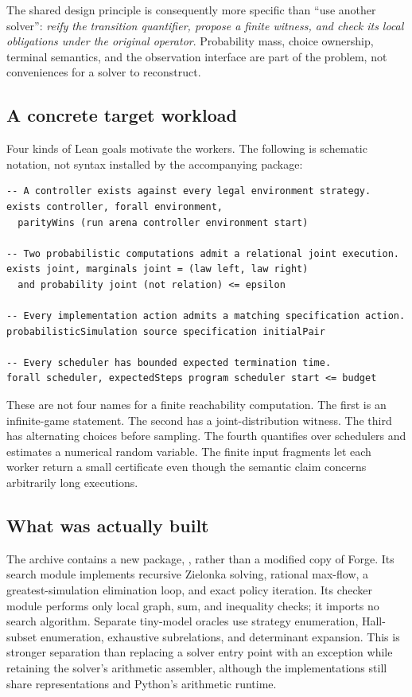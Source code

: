 The shared design principle is consequently more specific than ``use another
solver'': \emph{reify the transition quantifier, propose a finite witness, and
check its local obligations under the original operator}. Probability mass,
choice ownership, terminal semantics, and the observation interface are part of
the problem, not conveniences for a solver to reconstruct.

\subsection{A concrete target workload}

Four kinds of Lean goals motivate the workers. The following is schematic
notation, not syntax installed by the accompanying package:
\begin{lstlisting}
-- A controller exists against every legal environment strategy.
exists controller, forall environment,
  parityWins (run arena controller environment start)

-- Two probabilistic computations admit a relational joint execution.
exists joint, marginals joint = (law left, law right)
  and probability joint (not relation) <= epsilon

-- Every implementation action admits a matching specification action.
probabilisticSimulation source specification initialPair

-- Every scheduler has bounded expected termination time.
forall scheduler, expectedSteps program scheduler start <= budget
\end{lstlisting}

These are not four names for a finite reachability computation. The first is an
infinite-game statement. The second has a joint-distribution witness. The third
has alternating choices before sampling. The fourth quantifies over schedulers
and estimates a numerical random variable. The finite input fragments let each
worker return a small certificate even though the semantic claim concerns
arbitrarily long executions.

\subsection{What was actually built}

The archive contains a new package, , rather than a modified copy
of Forge. Its search module implements recursive Zielonka solving, rational
max-flow, a greatest-simulation elimination loop, and exact policy iteration.
Its checker module performs only local graph, sum, and inequality checks; it
imports no search algorithm. Separate tiny-model oracles use strategy
enumeration, Hall-subset enumeration, exhaustive subrelations, and determinant
expansion. This is stronger separation than replacing a solver entry point with
an exception while retaining the solver's arithmetic assembler, although the
implementations still share representations and Python's arithmetic runtime.

